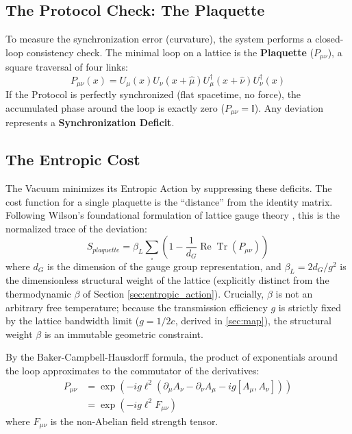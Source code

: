 \subsection{The Protocol Check: The Plaquette}
To measure the synchronization error (curvature), the system performs a closed-loop consistency check. The minimal loop on a lattice is the \textbf{Plaquette} ($P_{\mu\nu}$), a square traversal of four links:
\begin{equation}
    P_{\mu\nu}(x) = U_\mu(x) U_\nu(x+\hat{\mu}) U^\dagger_\mu(x+\hat{\nu}) U^\dagger_\nu(x)
\end{equation}
If the Protocol is perfectly synchronized (flat spacetime, no force), the accumulated phase around the loop is exactly zero ($P_{\mu\nu} = \mathbb{I}$). Any deviation represents a \textbf{Synchronization Deficit}.

\subsection{The Entropic Cost}
The Vacuum minimizes its Entropic Action by suppressing these deficits. The cost function for a single plaquette is the ``distance'' from the identity matrix. Following Wilson's foundational formulation of lattice gauge theory \cite{wilson_confinement_1974}, this is the normalized trace of the deviation:
\begin{equation}
    S_{plaquette} = \beta_L \sum_{\square} \left( 1 - \frac{1}{d_G} \operatorname{Re} \operatorname{Tr}(P_{\mu\nu}) \right)
\end{equation}
where $d_G$ is the dimension of the gauge group representation, and $\beta_L = 2d_G/g^2$ is the dimensionless structural weight of the lattice (explicitly distinct from the thermodynamic $\beta$ of Section \ref{sec:entropic_action}). Crucially, $\beta$ is not an arbitrary free temperature; because the transmission efficiency $g$ is strictly fixed by the lattice bandwidth limit ($g = 1/2c$, derived in \cref{sec:map}), the structural weight $\beta$ is an immutable geometric constraint.

By the Baker-Campbell-Hausdorff formula, the product of exponentials around the loop approximates to the commutator of the derivatives:
\begin{equation}
\begin{split}
    P_{\mu\nu} &= \exp\left( -ig \ell^2 (\partial_\mu A_\nu - \partial_\nu A_\mu - ig[A_\mu, A_\nu]) \right) \\
    &= \exp\left( -ig \ell^2 F_{\mu\nu} \right)
\end{split}
\end{equation}
where $F_{\mu\nu}$ is the non-Abelian field strength tensor.

